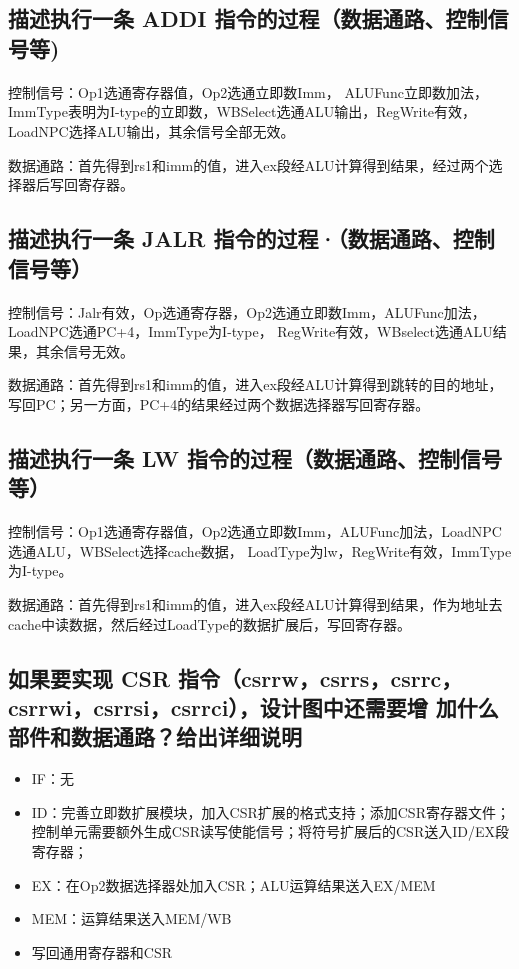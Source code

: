 \documentclass{article}
\begin{document}
    \subsection{描述执行一条 ADDI 指令的过程（数据通路、控制信号等)}
    \paragraph{}
    控制信号：Op1选通寄存器值，Op2选通立即数Imm，
    ALUFunc立即数加法，ImmType表明为I-type的立即数，WBSelect选通ALU输出，RegWrite有效，LoadNPC选择ALU输出，其余信号全部无效。
    

    数据通路：首先得到rs1和imm的值，进入ex段经ALU计算得到结果，经过两个选择器后写回寄存器。
    \subsection{描述执行一条 JALR 指令的过程·（数据通路、控制信号等）}
    \paragraph{}
    控制信号：Jalr有效，Op选通寄存器，Op2选通立即数Imm，ALUFunc加法，LoadNPC选通PC+4，ImmType为I-type，
    RegWrite有效，WBselect选通ALU结果，其余信号无效。
    

    数据通路：首先得到rs1和imm的值，进入ex段经ALU计算得到跳转的目的地址，写回PC；另一方面，PC+4的结果经过两个数据选择器写回寄存器。

    \subsection{描述执行一条 LW 指令的过程（数据通路、控制信号等）}
    \paragraph{}
    控制信号：Op1选通寄存器值，Op2选通立即数Imm，ALUFunc加法，LoadNPC选通ALU，WBSelect选择cache数据，
    LoadType为lw，RegWrite有效，ImmType为I-type。
    

    数据通路：首先得到rs1和imm的值，进入ex段经ALU计算得到结果，作为地址去cache中读数据，然后经过LoadType的数据扩展后，写回寄存器。
    \subsection{如果要实现 CSR 指令（csrrw，csrrs，csrrc，csrrwi，csrrsi，csrrci），设计图中还需要增
    加什么部件和数据通路？给出详细说明}
    \begin{itemize}
        \item IF：无
        \item ID：完善立即数扩展模块，加入CSR扩展的格式支持；添加CSR寄存器文件；控制单元需要额外生成CSR读写使能信号；将符号扩展后的CSR送入ID/EX段寄存器；
        \item EX：在Op2数据选择器处加入CSR；ALU运算结果送入EX/MEM
        \item MEM：运算结果送入MEM/WB
        \item 写回通用寄存器和CSR
    \end{itemize}
\end{document}
